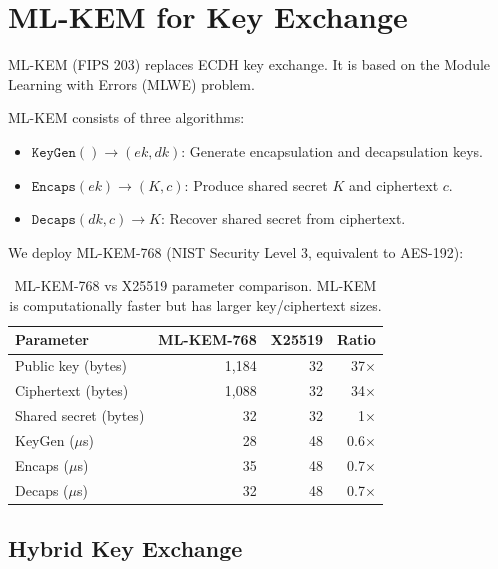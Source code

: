 \section{ML-KEM for Key Exchange}

\label{sec:mlkem}

ML-KEM (FIPS 203) replaces ECDH key exchange. It is based on the Module
Learning with Errors (MLWE) problem.

\begin{definition}[ML-KEM]
ML-KEM consists of three algorithms:
\begin{itemize}[leftmargin=1.1em]
    \item $\texttt{KeyGen}() \to (ek, dk)$: Generate encapsulation and
    decapsulation keys.
    \item $\texttt{Encaps}(ek) \to (K, c)$: Produce shared secret $K$ and
    ciphertext $c$.
    \item $\texttt{Decaps}(dk, c) \to K$: Recover shared secret from
    ciphertext.
\end{itemize}
\end{definition}

We deploy ML-KEM-768 (NIST Security Level 3, equivalent to AES-192):

\begin{table}[H]
\centering
\small
\begin{tabular}{lrrr}
\toprule
\textbf{Parameter} & \textbf{ML-KEM-768} & \textbf{X25519} & \textbf{Ratio} \\
\midrule
Public key (bytes) & 1,184 & 32 & 37$\times$ \\
Ciphertext (bytes) & 1,088 & 32 & 34$\times$ \\
Shared secret (bytes) & 32 & 32 & 1$\times$ \\
KeyGen ($\mu$s) & 28 & 48 & 0.6$\times$ \\
Encaps ($\mu$s) & 35 & 48 & 0.7$\times$ \\
Decaps ($\mu$s) & 32 & 48 & 0.7$\times$ \\
\bottomrule
\end{tabular}
\caption{ML-KEM-768 vs X25519 parameter comparison. ML-KEM is computationally
faster but has larger key/ciphertext sizes.}
\label{tab:mlkem}
\end{table}

\subsection{Hybrid Key Exchange}

